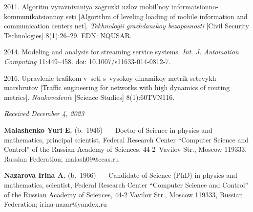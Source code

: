 \begin{multicols}{2}
{{\begin{thebibliography}{9}
 2011. Algoritm 
vyravnivaniya zagruzki uzlov mobil'noy informatsionno-kommunikatsionnoy seti 
[Algorithm of leveling loading of mobile information and communication centers 
net]. \textit{Tekhnologii grazhdanskoy bezopasnosti} [Civil Security 
Technologies] 8(1):26--29. EDN: NQUSAR.

 2014. Modeling and 
analysis for streaming service systems. \textit{Int. J. 
Automation Computing} 11:449--458. doi: 10.1007/s11633-014-0812-7.

 2016. Upravlenie trafikom v~seti s~vysokoy dinamikoy metrik setevykh marshrutov [Traffic engineering for networks 
with high dynamics of routing metrics]. \textit{Naukovedenie} [Science Studies] 8(1):60TVN116.


 \end{thebibliography}

 }
 }

\end{multicols}

\vspace*{-8pt}

\hfill{\small\textit{Received December 4, 2023}} 

\vspace*{-22pt}
 
      \Contr

\vspace*{-4pt}

\noindent
\textbf{Malashenko Yuri E.} (b.\ 1946)~--- Doctor of Science in physics and 
mathematics, principal scientist, Federal Research Center ``Computer Science 
and Control'' of the Russian Academy of Sciences, 44-2~Vavilov Str., Moscow 
119333, Russian Federation; \mbox{malash09@ccas.ru }


\noindent
\textbf{Nazarova Irina A.} (b.\ 1966)~--- Candidate of Science (PhD) in physics 
and mathematics, scientist, Federal Research Center ``Computer Science and 
Control'' of the Russian Academy of Sciences, 44-2 Vavilov Str., Moscow 119333, 
Russian Federation; \mbox{irina-nazar@yandex.ru}




        
\label{end\stat}

\renewcommand{\bibname}{\protect\rm Литература} 